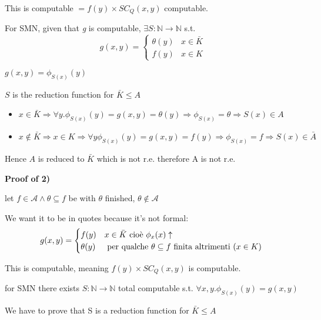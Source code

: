 \documentclass{amsbook}
\newcommand{\nat}{\ensuremath{\mathbb{N}}}
\theoremstyle{definition}
\theoremstyle{remark}
\numberwithin{section}{chapter}
\numberwithin{equation}{chapter}
\begin{document}
This is computable $ = f(y) \times SC_Q(x,y) $ computable.

For SMN, given that \textit{g} is computable, $ \exists S:\nat\rightarrow\nat $ s.t.
\begin{equation*}
	g(x,y) = \begin{cases}
		\theta(y) & x \in \bar{K} \\
		f(y)      & x \in K
	\end{cases}
\end{equation*}

$ g(x,y) = \phi_{S(x)}(y)$

$S$ is the reduction function for $ \bar{K}\leq A $

\begin{itemize}
	\item $ x\in\bar{K} \Rightarrow \forall y. \phi_{S(x)}(y) = g(x,y) = \theta(y) \Rightarrow \phi_{S(x)} = \theta \Rightarrow S(x) \in A $
	\item $ x\not\in\bar{K}\Rightarrow x\in K\Rightarrow\forall y\phi_{S(x)}(y) = g(x,y)=f(y)\Rightarrow\phi_{S(x)}=f\Rightarrow S(x)\in\bar{A}$
\end{itemize}

Hence $A$ is reduced to $ \bar{K} $ which is not r.e. therefore A is not r.e.

\textbf{Proof of 2)}

let $ f\in\mathcal{A}\land\theta\subseteq f $ be with $ \theta $ finished, $ \theta\not\in\mathcal{A} $

We want it to be in quotes because it's not formal: \begin{equation*}
	g(x,y) = \begin{cases}
		f(y)      & x \in\bar{K} $ cioè $ \phi_x(x)\uparrow                              \\
		\theta(y) & $ per qualche $ \theta\subseteq f $ finita altrimenti ($ x\in K $) $
	\end{cases}
\end{equation*}

This is computable, meaning $f(y) \times SC_Q(x,y) $ is computable.

for SMN there exists $ S:\nat\rightarrow\nat $ total computable s.t. $ \forall x,y. \phi_{S(x)}(y) = g(x,y) $

We have to prove that S is a reduction function for $ \bar{K}\leq A $
\end{document}

